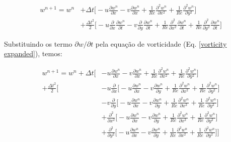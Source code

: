 \begin{equation}
\begin{aligned}
 w^{n+1} = w^{n} 
         & + \Delta t 
         \Bigg[
         - u \frac{\partial w^{n}}{\partial x}
         - v \frac{\partial w^{n}}{\partial x}
         + \frac{1}{Re} \frac{\partial^2 w^{n}}{\partial x^2} 
         + \frac{1}{Re} \frac{\partial^2 w^{n}}{\partial y^2} 
         \Bigg]
         \\[5pt]
         & + \frac{\Delta t^2}{2}
         \Bigg[
         - u
         \frac{\partial }{\partial x}
         \frac{\partial w^{n}}{\partial t}
         - v
         \frac{\partial }{\partial y}
         \frac{\partial w^{n}}{\partial t}
         + \frac{1}{Re} \frac{\partial^2 }{\partial x^2}
         \frac{\partial w^{n}}{\partial t} 
         + \frac{1}{Re} \frac{\partial^2 }{\partial y^2}
         \frac{\partial w^{n}}{\partial t} 
         \Bigg]
\end{aligned}
\end{equation}

\noindent
Substituindo os termo $\partial w/ \partial t$ pela equação
de vorticidade (Eq. \ref{vorticity expanded}), temos:

\begin{equation}
\begin{aligned}
 w^{n+1} = w^{n} 
         + \Delta t 
         \Bigg[
         & - u \frac{\partial w^{n}}{\partial x}
         - v \frac{\partial w^{n}}{\partial x}
         + \frac{1}{Re} \frac{\partial^2 w^{n}}{\partial x^2} 
         + \frac{1}{Re} \frac{\partial^2 w^{n}}{\partial y^2} 
         \Bigg]
         \\[5pt]
         + \frac{\Delta t^2}{2}
         \Bigg[
         & - u
         \frac{\partial }{\partial x}
         \Bigg[
          - u \frac{\partial w^{n}}{\partial x}
          - v \frac{\partial w^{n}}{\partial y}
          + \frac{1}{Re} \frac{\partial^2 w^{n}}{\partial x^2} 
          + \frac{1}{Re} \frac{\partial^2 w^{n}}{\partial y^2} 
         \Bigg]
         \\[5pt]
         & - v
         \frac{\partial }{\partial y}
         \Bigg[
          - u \frac{\partial w^{n}}{\partial x}
          - v \frac{\partial w^{n}}{\partial y}
          + \frac{1}{Re} \frac{\partial^2 w^{n}}{\partial x^2} 
          + \frac{1}{Re} \frac{\partial^2 w^{n}}{\partial y^2} 
         \Bigg]
         \\[5pt]
         & + \frac{\partial^2 }{\partial x^2}
         \Bigg[
          - u \frac{\partial w^{n}}{\partial x}
          - v \frac{\partial w^{n}}{\partial y}
          + \frac{1}{Re} \frac{\partial^2 w^{n}}{\partial x^2} 
          + \frac{1}{Re} \frac{\partial^2 w^{n}}{\partial y^2} 
         \Bigg]
         \\[5pt]
         & + \frac{\partial^2 }{\partial y^2}
         \Bigg[
          - u \frac{\partial w^{n}}{\partial x}
          - v \frac{\partial w^{n}}{\partial y}
          + \frac{1}{Re} \frac{\partial^2 w^{n}}{\partial x^2} 
          + \frac{1}{Re} \frac{\partial^2 w^{n}}{\partial y^2} 
         \Bigg]
         \Bigg]
\end{aligned}
\end{equation}

